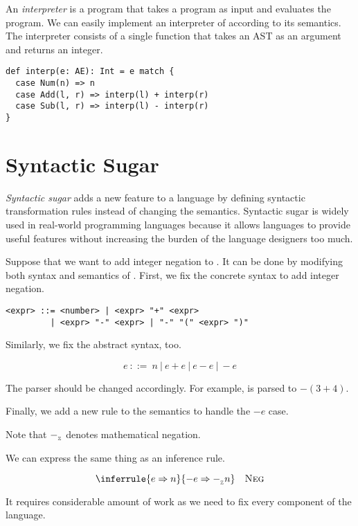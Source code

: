 An \textit{interpreter} is a program that takes a program as
input and evaluates the program. We can easily implement an interpreter of
\lang according to its semantics. The interpreter consists of a single function
that takes an AST as an argument and returns an integer.

\begin{verbatim}
def interp(e: AE): Int = e match {
  case Num(n) => n
  case Add(l, r) => interp(l) + interp(r)
  case Sub(l, r) => interp(l) - interp(r)
}
\end{verbatim}

\section{Syntactic Sugar}

\textit{Syntactic sugar} adds a new feature to a language
by defining syntactic transformation rules instead of changing the semantics.
Syntactic sugar is widely used in real-world programming languages because it
allows languages to provide useful features without increasing the burden of the
language designers too much.

Suppose that we want to add integer negation to \lang. It can be done by
modifying both syntax and semantics of \lang. First, we fix the concrete syntax
to add integer negation.

\begin{verbatim}
<expr> ::= <number> | <expr> "+" <expr>
         | <expr> "-" <expr> | "-" "(" <expr> ")"
\end{verbatim}

Similarly, we fix the abstract syntax, too.

\[e\ ::=\ n\ |\ e+e\ |\ e-e\ |\ -e\]

The parser should be changed accordingly. For example,  is parsed
to $-(3+4)$.

Finally, we add a new rule to the semantics to handle the $-e$ case.


Note that $-_{{}_{\mathbb{Z}}}$ denotes mathematical negation.

We can express the same thing as an inference rule.

\[
  \inferrule
  { e\Rightarrow n}
  { -e\Rightarrow\isub n }
  \quad\textsc{Neg}
\]

It requires considerable amount of work as we need to fix every component of the language.

